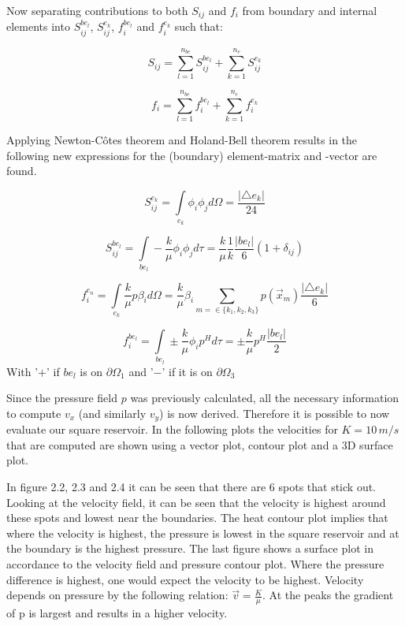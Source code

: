 \documentclass[a4paper]{report}
\begin{document}
Now separating contributions to both $S_{ij}$ and $f_i$ from boundary and internal elements into $S_{ij}^{be_l}$, $S_{ij}^{e_k}$, $f_i^{be_l}$ and $f_i^{e_k}$ such that:

\begin{equation}
	S_{ij} = \sum\limits_{l=1}^{n_{be}} S_{ij}^{be_{l}} + \sum\limits_{k=1}^{n_{e}} S_{ij}^{e_{k}}
\end{equation}

\begin{equation}
f_{i} = \sum\limits_{l=1}^{n_{be}} f_{i}^{be_{l}} + \sum\limits_{k=1}^{n_{e}} f_{i}^{e_{k}}
\end{equation}

Applying Newton-Côtes theorem and Holand-Bell theorem results in the following new expressions for the (boundary) element-matrix and -vector are found.

\begin{equation}
S^{e_k}_{ij}=\int\limits_{e_k}\phi_i\phi_j d\Omega= \frac{\lvert\triangle e_k \rvert}{24}
\end{equation}

\begin{equation}
S^{be_l}_{ij}=\int\limits_{be_l}-\frac{k}{\mu}\phi_i\phi_j d\tau = \frac{k}{\mu}\frac{1}{k}\frac{\lvert be_l\rvert}{6}(1+\delta_{ij})
\end{equation}

\begin{equation}
f^{e_n}_{i} = \int\limits_{e_k}\frac{k}{\mu}p\beta_i d\Omega = \frac{k}{\mu}\beta_i\sum_{m=\in\{k_1,k_2,k_3\}} p(\vec{x}_m) \frac{\lvert \triangle e_k\rvert}{6}
\end{equation}

\begin{equation}
f^{be_l}_{i}=\int\limits_{be_l}\pm \frac{k}{\mu}\phi_ip^H d\tau = \pm \frac{k}{\mu}p^H \frac{\lvert be_l\rvert}{2}
\end{equation}
With '$+$' if $be_{l}$ is on $\partial\Omega_1$ and '$-$' if it is on $\partial\Omega_3$
\vspace{5mm}

Since the pressure field $p$ was previously calculated, all the necessary information to compute $v_x$ (and similarly $v_y$) is now derived. Therefore it is possible to now evaluate our square reservoir. In the following plots the velocities for $K=10\,m/s$ that are computed are shown using a vector plot, contour plot and a 3D surface plot.\par 
In figure 2.2, 2.3 and 2.4 it can be seen that there are 6 spots that stick out. Looking at the velocity field, it can be seen that the velocity is highest around these spots and lowest near the boundaries. The heat contour plot implies that where the velocity is highest, the pressure is lowest in the square reservoir and at the boundary is the highest pressure. The last figure shows a surface plot
in accordance to the velocity field and pressure contour plot. Where the pressure difference is highest, one would expect the velocity to be highest. Velocity depends on pressure by the following relation: $\vec{v}= \frac{K}{\mu}$. At the peaks the gradient of p is largest and results in a higher velocity.
\end{document}
